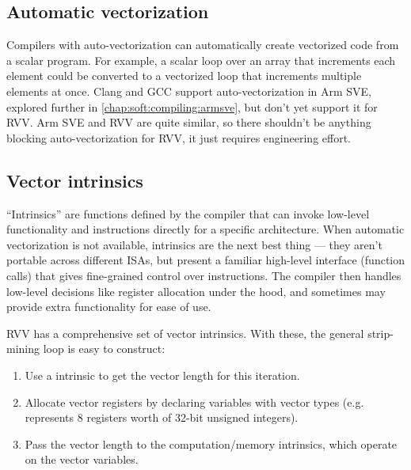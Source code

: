 \documentclass[../thesis]{subfiles}
\begin{document}
\subsection{Automatic vectorization}
Compilers with auto-vectorization can automatically create vectorized code from a scalar program.
For example, a scalar loop over an array that increments each element could be converted to a vectorized loop that increments multiple elements at once.
Clang and GCC support auto-vectorization in Arm SVE, explored further in \cref{chap:soft:compiling:armsve}, but don't yet support it for RVV.
Arm SVE and RVV are quite similar, so there shouldn't be anything blocking auto-vectorization for RVV, it just requires engineering effort.

\subsection{Vector intrinsics}
\enquote{Intrinsics} are functions defined by the compiler that can invoke low-level functionality and instructions directly for a specific architecture.
When automatic vectorization is not available, intrinsics are the next best thing --- they aren't portable across different ISAs, but present a familiar high-level interface (function calls) that gives fine-grained control over instructions.
The compiler then handles low-level decisions like register allocation under the hood, and sometimes may provide extra functionality for ease of use.

RVV has a comprehensive set of vector intrinsics\cite{specification-RVV-intrinsics}.
With these, the general strip-mining loop is easy to construct:
\begin{enumerate}
    \item Use a  intrinsic to get the vector length for this iteration.
    \item Allocate vector registers by declaring variables with vector types (e.g.  represents 8 registers worth of 32-bit unsigned integers).
    \item Pass the vector length to the computation/memory intrinsics, which operate on the vector variables.
\end{enumerate}
\end{document}
